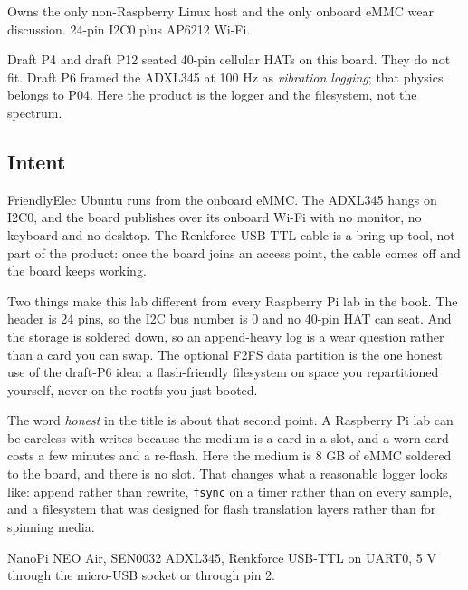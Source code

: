 
\begin{unique}
Owns the only non-Raspberry Linux host and the only onboard eMMC wear discussion. 24-pin I2C0 plus AP6212 Wi-Fi.
\end{unique}

\begin{blueprint}
Draft P4 and draft P12 seated 40-pin cellular HATs on this board. They do not fit. Draft P6 framed the ADXL345 at 100 Hz as \emph{vibration logging}; that physics belongs to P04. Here the product is the logger and the filesystem, not the spectrum.
\end{blueprint}

\subsection*{Intent}

FriendlyElec Ubuntu runs from the onboard eMMC. The ADXL345 hangs on I2C0, and the board publishes over its onboard Wi-Fi with no monitor, no keyboard and no desktop. The Renkforce USB-TTL cable is a bring-up tool, not part of the product: once the board joins an access point, the cable comes off and the board keeps working.

Two things make this lab different from every Raspberry Pi lab in the book. The header is 24 pins, so the I2C bus number is 0 and no 40-pin HAT can seat. And the storage is soldered down, so an append-heavy log is a wear question rather than a card you can swap. The optional F2FS data partition is the one honest use of the draft-P6 idea: a flash-friendly filesystem on space you repartitioned yourself, never on the rootfs you just booted.

The word \emph{honest} in the title is about that second point. A Raspberry Pi lab can be careless with writes because the medium is a card in a slot, and a worn card costs a few minutes and a re-flash. Here the medium is 8 GB of eMMC soldered to the board, and there is no slot. That changes what a reasonable logger looks like: append rather than rewrite, \texttt{fsync} on a timer rather than on every sample, and a filesystem that was designed for flash translation layers rather than for spinning media.

\begin{kit}
NanoPi NEO Air, SEN0032 ADXL345, Renkforce USB-TTL on UART0, 5 V through the micro-USB socket or through pin 2.
\end{kit}


